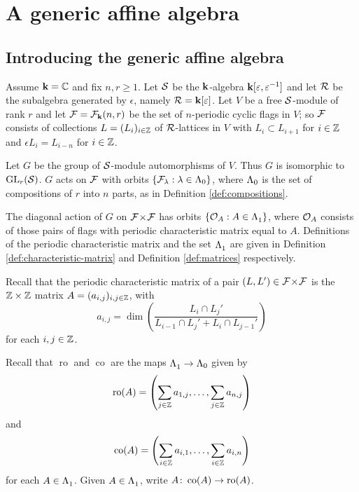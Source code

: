 \documentclass[a4paper, 11pt]{report}
\begin{document}
\chapter{A generic affine algebra}

\section{Introducing the generic affine algebra}

Assume $\mathbf{k} = \mathbb{C}$ and fix $n,r\geq 1$. Let $\mathcal{S}$ be the $\mathbf{k}$-algebra $\mathbf{k}[\varepsilon,\varepsilon^{-1}]$ and let $\mathcal{R}$ be the subalgebra generated by $\epsilon$, namely $\mathcal{R}=\mathbf{k}[\varepsilon]$. Let $V$ be a free $\mathcal{S}$-module of rank $r$ and let $\mathcal{F} = \mathcal{F}_{\mathbf{k}}(n,r)$ be the set of $n$-periodic cyclic flags in $V$; so $\mathcal{F}$ consists of collections $L = (L_i)_{i\in\mathbb{Z}}$ of $\mathcal{R}$-lattices in $V$ with $L_i\subset L_{i+1}$ for $i\in\mathbb{Z}$ and $\epsilon L_i = L_{i-n}$ for $i\in\mathbb{Z}$.

Let $G$ be the group of $\mathcal{S}$-module automorphisms of $V$. Thus $G$ is isomorphic to $\operatorname{GL}_{r}(\mathcal{S})$. $G$ acts on $\mathcal{F}$ with orbits $\{\mathcal{F}_\lambda:\lambda\in{\Lambda_0}\}$, where ${\Lambda_0}$ is the set of compositions of $r$ into $n$ parts, as in Definition \ref{def:compositions}.

The diagonal action of $G$ on ${\mathcal{F}\!\times\!\mathcal{F}}$ has orbits $\{\mathcal{O}_{A}:A\in\Lambda_1^{}\}$, where $\mathcal{O}_{A}$ consists of those pairs of flags with periodic characteristic matrix equal to $A$. Definitions of the periodic characteristic matrix and the set $\Lambda_1^{}$ are given in Definition \ref{def:characteristic-matrix} and Definition \ref{def:matrices} respectively.

Recall that the periodic characteristic matrix of a pair $(L,L')\in{\mathcal{F}\!\times\!\mathcal{F}}$ is the $\mathbb{Z}\times\mathbb{Z}$ matrix $A = (a_{i,j})_{i,j\in\mathbb{Z}}$, with
\begin{equation*}
a_{i,j} = \dim\left(\frac{L_i\cap L_j'}{L_{i-1}\cap L_j' + L_i\cap L_{j-1}'}\right)
\end{equation*}
for each $i,j\in\mathbb{Z}$.

Recall that $\operatorname{ro}$ and $\operatorname{co}$ are the maps $\Lambda_1^{}\to{\Lambda_0}$ given by
\begin{equation*}
\operatorname{ro}(A) = \left(\sum_{j\in\mathbb{Z}} a_{1,j},\ldots, \sum_{j\in\mathbb{Z}}a_{n,j}\right)
\end{equation*}
and
\begin{equation*}
\operatorname{co}(A) = \left(\sum_{i\in\mathbb{Z}} a_{i,1},\ldots, \sum_{i\in\mathbb{Z}} a_{i,n}\right)
\end{equation*}
for each $A\in\Lambda_1^{}$. Given $A\in\Lambda_1^{}$, write $A\colon\operatorname{co}(A)\to\operatorname{ro}(A)$.
\end{document}

